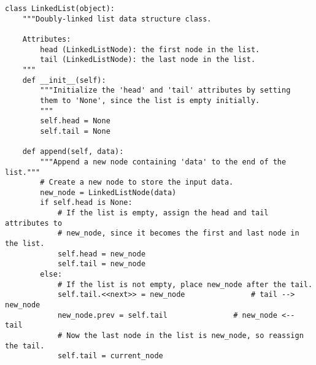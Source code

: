 \begin{lstlisting}
class LinkedList(object):
    """Doubly-linked list data structure class.

    Attributes:
        head (LinkedListNode): the first node in the list.
        tail (LinkedListNode): the last node in the list.
    """
    def __init__(self):
        """Initialize the 'head' and 'tail' attributes by setting
        them to 'None', since the list is empty initially.
        """
        self.head = None
        self.tail = None

    def append(self, data):
        """Append a new node containing 'data' to the end of the list."""
        # Create a new node to store the input data.
        new_node = LinkedListNode(data)
        if self.head is None:
            # If the list is empty, assign the head and tail attributes to
            # new_node, since it becomes the first and last node in the list.
            self.head = new_node
            self.tail = new_node
        else:
            # If the list is not empty, place new_node after the tail.
            self.tail.<<next>> = new_node               # tail --> new_node
            new_node.prev = self.tail               # new_node <-- tail
            # Now the last node in the list is new_node, so reassign the tail.
            self.tail = current_node
\end{lstlisting}

